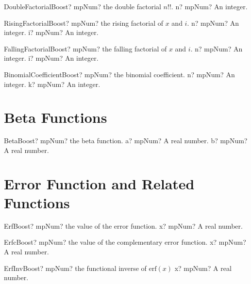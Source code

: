 \documentclass[12pt,a4paper,openany]{book}
\begin{document}
\begin{mpFunctionsExtract}
\mpFunctionOne
{DoubleFactorialBoost? mpNum? the double factorial $n!!$.}
{n? mpNum? An integer.}
\end{mpFunctionsExtract}

\begin{mpFunctionsExtract}
\mpFunctionTwo
{RisingFactorialBoost? mpNum? the rising factorial of $x$ and $i$.}
{n? mpNum? An integer.}
{i? mpNum? An integer.}
\end{mpFunctionsExtract}

\begin{mpFunctionsExtract}
\mpFunctionTwo
{FallingFactorialBoost? mpNum? the falling factorial of $x$ and $i$.}
{n? mpNum? An integer.}
{i? mpNum? An integer.}
\end{mpFunctionsExtract}

\begin{mpFunctionsExtract}
\mpFunctionTwo
{BinomialCoefficientBoost? mpNum? the binomial coefficient.}
{n? mpNum? An integer.}
{k? mpNum? An integer.}
\end{mpFunctionsExtract}

\section{Beta Functions}

\begin{mpFunctionsExtract}
\mpFunctionTwo
{BetaBoost? mpNum? the beta function.}
{a? mpNum? A real number.}
{b? mpNum? A real number.}
\end{mpFunctionsExtract}

\section{Error Function and Related Functions}

\begin{mpFunctionsExtract}
\mpFunctionOne
{ErfBoost? mpNum? the value of the error function.}
{x? mpNum? A real number.}
\end{mpFunctionsExtract}

\begin{mpFunctionsExtract}
\mpFunctionOne
{ErfcBoost? mpNum? the value of the complementary error function.}
{x? mpNum? A real number.}
\end{mpFunctionsExtract}

\begin{mpFunctionsExtract}
\mpFunctionOne
{ErfInvBoost? mpNum? the functional inverse of $\text{erf}(x)$}
{x? mpNum? A real number.}
\end{mpFunctionsExtract}
\end{document}
